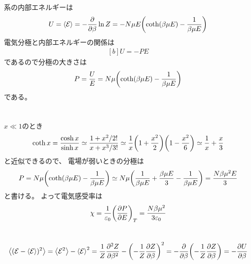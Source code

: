 \documentclass[../../master.tex]{subfiles}
\begin{document}
\section{}
系の内部エネルギーは
\begin{equation}\begin{aligned}[b]
    U = \ev{\mathcal{E}} = -\pdv{\beta}\ln Z = -N\mu E \qty(\coth(\beta\mu E)-\frac{1}{\beta\mu E})
\end{aligned}\end{equation}
電気分極と内部エネルギーの関係は
\begin{equation}\begin{aligned}[b]
    U = -PE
\end{aligned}\end{equation}
であるので分極の大きさは
\begin{equation}\begin{aligned}[b]
    P = \frac{U}{E} = N\mu\qty(\coth(\beta\mu E)-\frac{1}{\beta\mu E})
\end{aligned}\end{equation}
である。

\section{}
\(x\ll 1\)のとき
\begin{equation}\begin{aligned}[b]
    \coth x = \frac{\cosh x}{\sinh x} \simeq \frac{1+x^2/2!}{x + x^3/3!}
    \simeq\frac{1}{x}\qty(1+\frac{x^2}{2})\qty(1-\frac{x^2}{6})
    \simeq \frac{1}{x}+\frac{x}{3}
\end{aligned}\end{equation}
と近似できるので、
電場が弱いときの分極は
\begin{equation}\begin{aligned}[b]
    P = N\mu\qty(\coth(\beta\mu E)-\frac{1}{\beta\mu E})
    \simeq N\mu\qty(\frac{1}{\beta\mu E}+\frac{\beta \mu E}{3}-\frac{1}{\beta\mu E})
    = \frac{N\beta\mu^2E}{3}
\end{aligned}\end{equation}
と書ける。
よって電気感受率は
\begin{equation}\begin{aligned}[b]
    \chi = \frac{1}{\varepsilon_0}\qty(\pdv{P}{E})_T = \frac{N\beta\mu^2}{3\varepsilon_0}
\end{aligned}\end{equation}

\section{}
\begin{equation}\begin{aligned}[b]
    \ev{(\mathcal{E}-\ev{\mathcal{E}})^2}
    = \ev{\mathcal{E}^2}-\ev{\mathcal{E}}^2
    = \frac{1}{Z}\pdv[2]{Z}{\beta}-\qty(-\frac{1}{Z}\pdv{Z}{\beta})^2
    = -\pdv{\beta}\qty(-\frac{1}{Z}\pdv{Z}{\beta})
    = -\pdv{U}{\beta}
\end{aligned}\end{equation}
\end{document}
